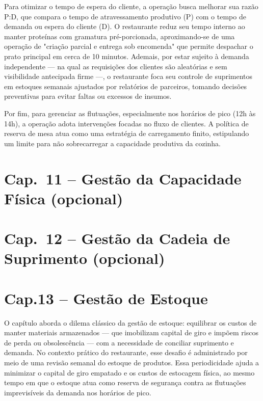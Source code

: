 \documentclass[12pt, a4paper]{article}
\begin{document}
Para otimizar o tempo de espera do cliente, a operação busca melhorar sua razão P:D, que compara o tempo de atravessamento produtivo (P) com o tempo de demanda ou espera do cliente (D). O restaurante reduz seu tempo interno ao manter proteínas com gramatura pré-porcionada, aproximando-se de uma operação de "criação parcial e entrega sob encomenda" que permite despachar o prato principal em cerca de 10 minutos. Ademais, por estar sujeito à demanda independente — na qual as requisições dos clientes são aleatórias e sem visibilidade antecipada firme —, o restaurante foca seu controle de suprimentos em estoques semanais ajustados por relatórios de parceiros, tomando decisões preventivas para evitar faltas ou excessos de insumos.

Por fim, para gerenciar as flutuações, especialmente nos horários de pico (12h às 14h), a operação adota intervenções focadas no fluxo de clientes. A política de reserva de mesa atua como uma estratégia de carregamento finito, estipulando um limite para não sobrecarregar a capacidade produtiva da cozinha.



\section{Cap.~11 – Gestão da Capacidade Física \textnormal{\small (opcional)}}



\section{Cap.~12 – Gestão da Cadeia de Suprimento \textnormal{\small (opcional)}}



\section{Cap.13 – Gestão de Estoque}
O capítulo aborda o dilema clássico da gestão de estoque: equilibrar os custos de manter materiais armazenados — que imobilizam capital de giro e impõem riscos de perda ou obsolescência — com a necessidade de conciliar suprimento e demanda. No contexto prático do restaurante, esse desafio é administrado por meio de uma revisão semanal do estoque de produtos. Essa periodicidade ajuda a minimizar o capital de giro empatado e os custos de estocagem física, ao mesmo tempo em que o estoque atua como reserva de segurança  contra as flutuações imprevisíveis da demanda nos horários de pico.
\end{document}
